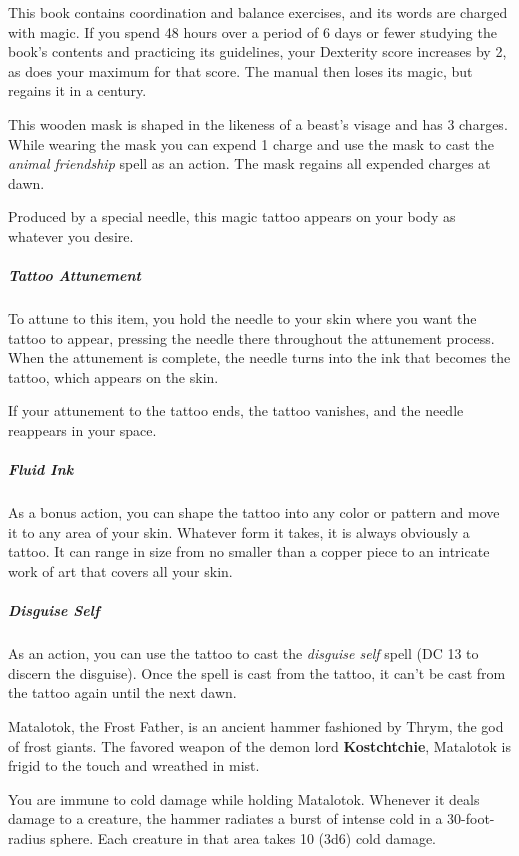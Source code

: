 \documentclass[10pt,a4paper,twoside,bg=print,twocolumn,openany,nodeprecatedcode]{dndbook}
\begin{document}
This book contains coordination and balance exercises, and its words are charged with magic. If you spend 48 hours over a period of 6 days or fewer studying the book's contents and practicing its guidelines, your Dexterity score increases by 2, as does your maximum for that score. The manual then loses its magic, but regains it in a century.

This wooden mask is shaped in the likeness of a beast's visage and has 3 charges. While wearing the mask you can expend 1 charge and use the mask to cast the \textit{animal friendship} spell as an action. The mask regains all expended charges at dawn.

Produced by a special needle, this magic tattoo appears on your body as whatever you desire.

\subparagraph{Tattoo Attunement}
To attune to this item, you hold the needle to your skin where you want the tattoo to appear, pressing the needle there throughout the attunement process. When the attunement is complete, the needle turns into the ink that becomes the tattoo, which appears on the skin.

If your attunement to the tattoo ends, the tattoo vanishes, and the needle reappears in your space.

\subparagraph{Fluid Ink}
As a bonus action, you can shape the tattoo into any color or pattern and move it to any area of your skin. Whatever form it takes, it is always obviously a tattoo. It can range in size from no smaller than a copper piece to an intricate work of art that covers all your skin.

\subparagraph{Disguise Self}
As an action, you can use the tattoo to cast the \textit{disguise self} spell (DC 13 to discern the disguise). Once the spell is cast from the tattoo, it can't be cast from the tattoo again until the next dawn.

Matalotok, the Frost Father, is an ancient hammer fashioned by Thrym, the god of frost giants. The favored weapon of the demon lord \textbf{Kostchtchie}, Matalotok is frigid to the touch and wreathed in mist.

You are immune to cold damage while holding Matalotok. Whenever it deals damage to a creature, the hammer radiates a burst of intense cold in a 30-foot-radius sphere. Each creature in that area takes 10 (3d6) cold damage.
\end{document}
